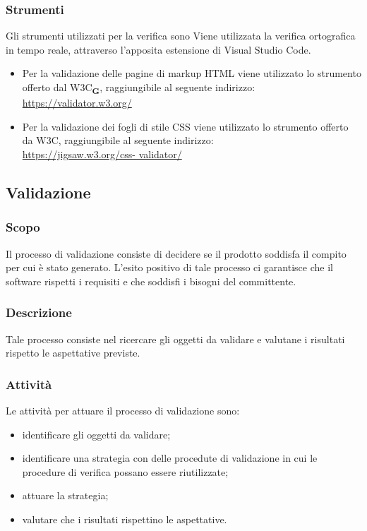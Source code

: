 \subsubsection{Strumenti}
Gli strumenti utilizzati per la verifica sono
Viene utilizzata la verifica ortografica in tempo reale, attraverso l'apposita estensione di Visual Studio Code.

\begin{itemize}
    \item Per la validazione delle pagine di markup HTML viene utilizzato lo strumento offerto dal W3C\textsubscript{\textbf{G}}, raggiungibile al seguente indirizzo:\\
          \href{https://validator.w3.org/}{https://validator.w3.org/}
    \item Per la validazione dei fogli di stile CSS viene utilizzato lo strumento offerto da W3C, raggiungibile al seguente indirizzo:\\
          \href{https://jigsaw.w3.org/css- validator/}{https://jigsaw.w3.org/css- validator/}

\end{itemize}
\subsection{Validazione}
\subsubsection{Scopo}
Il processo di validazione consiste di decidere se il prodotto soddisfa il compito per cui è stato generato. L'esito positivo di tale processo ci garantisce che il software rispetti i requisiti e che soddisfi i bisogni del committente.
\subsubsection{Descrizione}
Tale processo consiste nel ricercare gli oggetti da validare e valutane i risultati rispetto le aspettative previste.
\subsubsection{Attività}
Le attività per attuare il processo di validazione sono:
\begin{itemize}
    \item identificare gli oggetti da validare;
    \item identificare una strategia con delle procedute di validazione in cui le procedure di verifica possano essere riutilizzate;
    \item attuare la strategia;
    \item valutare che i risultati rispettino le aspettative.
\end{itemize}
